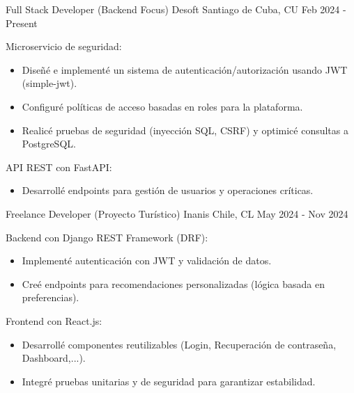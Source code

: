 
\begin{cventries}
  \cventry
    {Full Stack Developer (Backend Focus)} %
    {Desoft} %
    {Santiago de Cuba, CU} %
    {Feb 2024 - Present} %
    {
      \begin{cvitems} %
        \item{
          Microservicio de seguridad:
          \begin{itemize}
            \item Diseñé e implementé un sistema de autenticación/autorización usando JWT (simple-jwt).
            \item Configuré políticas de acceso basadas en roles para la plataforma.
            \item Realicé pruebas de seguridad (inyección SQL, CSRF) y optimicé consultas a PostgreSQL.
          \end{itemize}
        }
        \item {
          API REST con FastAPI:
          \begin{itemize}
            \item Desarrollé endpoints para gestión de usuarios y operaciones críticas.
          \end{itemize}
        }
      \end{cvitems}
    }
  
  \cventry
    {Freelance Developer (Proyecto Turístico)} %
    {Inanis} %
    {Chile, CL} %
    { May 2024 - Nov 2024} %
    {
      \begin{cvitems} %
        \item{
          Backend con Django REST Framework (DRF):
          \begin{itemize}
            \item Implementé autenticación con JWT y validación de datos.
            \item Creé endpoints para recomendaciones personalizadas (lógica basada en preferencias).
          \end{itemize}
        }
        \item {
          Frontend con React.js\::
          \begin{itemize}
            \item Desarrollé componentes reutilizables (Login, Recuperación de contraseña, Dashboard,...).
            \item Integré pruebas unitarias y de seguridad para garantizar estabilidad.
          \end{itemize}
        }
      \end{cvitems}
    }
\end{cventries}
